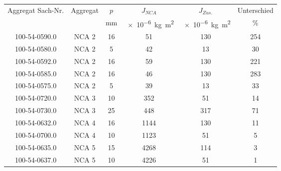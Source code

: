 




\begin{tabular}{cccccc}\toprule
Aggregat Sach-Nr. & Aggregat & $p$ & $J_{NCA} $ & $J_{Zus.}$ & Unterschied \\
 &  & \si{\milli\meter} & \SI{e-6}{\kilogram\meter\squared} & \SI{e-6}{\kilogram\meter\squared} & \% \\
 \midrule
100-54-0590.0 & NCA 2 & 16 & 51 & 130 & 254 \\
100-54-0580.0 & NCA 2 & 5 & 42 & 13 & 30 \\
100-54-0592.0 & NCA 2 & 16 & 59 & 130 & 221 \\
100-54-0585.0 & NCA 2 & 16 & 46 & 130 & 283 \\
100-54-0575.0 & NCA 2 & 5 & 39 & 13 & 33 \\
100-54-0720.0 & NCA 3 & 10 & 352 & 51 & 14 \\
100-54-0730.0 & NCA 3 & 25 & 448 & 317 & 71 \\
100-54-0632.0 & NCA 4 & 16 & 1144 & 130 & 11 \\
100-54-0700.0 & NCA 4 & 10 & 1123 & 51 & 5 \\
100-54-0635.0 & NCA 5 & 15 & 4268 & 114 & 3 \\
100-54-0637.0 & NCA 5 & 10 & 4226 & 51 & 1 \\
\bottomrule
\end{tabular}